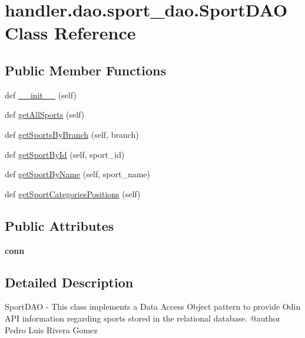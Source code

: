 \hypertarget{classhandler_1_1dao_1_1sport__dao_1_1_sport_d_a_o}{}\section{handler.\+dao.\+sport\+\_\+dao.\+Sport\+D\+AO Class Reference}
\label{classhandler_1_1dao_1_1sport__dao_1_1_sport_d_a_o}
\subsection*{Public Member Functions}
\begin{DoxyCompactItemize}
\item 
def \hyperlink{classhandler_1_1dao_1_1sport__dao_1_1_sport_d_a_o_ab567cd3aaebb51e725487d35827e477e}{\+\_\+\+\_\+init\+\_\+\+\_\+} (self)
\item 
def \hyperlink{classhandler_1_1dao_1_1sport__dao_1_1_sport_d_a_o_af58d24d75719ac7ee7d12c6a07b7bd7c}{get\+All\+Sports} (self)
\item 
def \hyperlink{classhandler_1_1dao_1_1sport__dao_1_1_sport_d_a_o_a4035819643d6056291007c663cb4a3a2}{get\+Sports\+By\+Branch} (self, branch)
\item 
def \hyperlink{classhandler_1_1dao_1_1sport__dao_1_1_sport_d_a_o_a5e661f49c07c8cbe8bad913645bd2890}{get\+Sport\+By\+Id} (self, sport\+\_\+id)
\item 
def \hyperlink{classhandler_1_1dao_1_1sport__dao_1_1_sport_d_a_o_a5952bf283f850965aeef34189c4c3cfa}{get\+Sport\+By\+Name} (self, sport\+\_\+name)
\item 
def \hyperlink{classhandler_1_1dao_1_1sport__dao_1_1_sport_d_a_o_a89205e68760e86f6a349a98ed49798d4}{get\+Sport\+Categories\+Positions} (self)
\end{DoxyCompactItemize}
\subsection*{Public Attributes}
\begin{DoxyCompactItemize}
\item 
\mbox{\label{classhandler_1_1dao_1_1sport__dao_1_1_sport_d_a_o_a7ca5b0f8d03cabbb9f2eec9abb9a70df}} 
{\bfseries conn}
\end{DoxyCompactItemize}


\subsection{Detailed Description}
\begin{DoxyVerb}SportDAO - This class implements a Data Access Object pattern to provide 
           Odin API information regarding sports stored in the relational 
           database.
@author Pedro Luis Rivera Gomez
\end{DoxyVerb}
 


